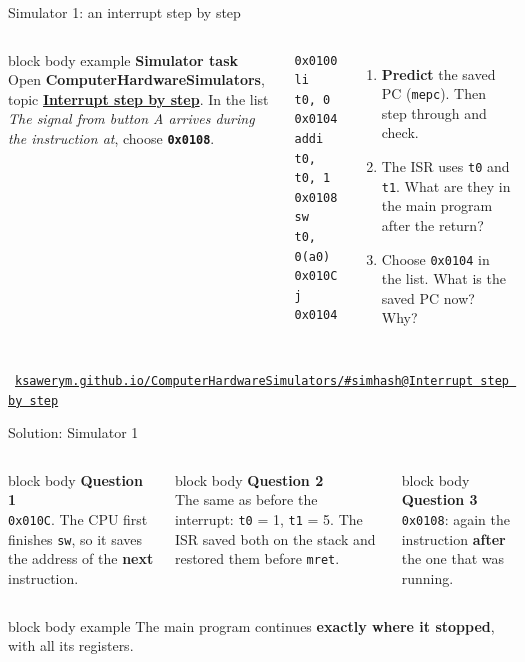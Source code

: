 \documentclass[aspectratio=169,10pt]{beamer}
\makeatletter
\newcommand{\stepbox}[2]{%
  \begin{beamercolorbox}[rounded=true,sep=0.09cm,wd=\linewidth]{block body}
    \footnotesize\textbf{#1}\\ #2
  \end{beamercolorbox}\vspace{0.06cm}}
\newcommand{\taskhead}[2]{%
  \begin{beamercolorbox}[rounded=true,sep=0.12cm,wd=\linewidth]{block body example}
    \small\textbf{#1}\\[0.04cm]
    \footnotesize #2
  \end{beamercolorbox}\vspace{0.1cm}}
\newcommand{\keymsg}[1]{%
  \begin{beamercolorbox}[rounded=true,sep=0.1cm,wd=\textwidth]{block body example}
    \centering\footnotesize #1
  \end{beamercolorbox}}
\newcommand{\simname}{\textbf{ComputerHardwareSimulators}}
\newcommand{\simbase}{https://ksawerym.github.io/ComputerHardwareSimulators/}
\newcommand{\simhash}[1]{\csname simhash@#1\endcsname}
\newcommand{\simtab}[1]{\href{\simbase\#\simhash{#1}}{\textcolor{DeepBlue}{\textbf{#1}}}}
\newcommand{\simaddr}[1]{\href{\simbase\#\simhash{#1}}{\texttt{ksawerym.github.io/ComputerHardwareSimulators/\#\simhash{#1}}}}
\newcommand{\simfoot}[1]{\par\vfill{\hfill\scriptsize\textcolor{gray}{\faLink\ #1}\par}}
\makeatother
\begin{document}
\begin{frame}[fragile]{Simulator 1: an interrupt step by step}
  \begin{columns}[T,onlytextwidth]
      \taskhead{Simulator task}{Open \simname, topic \simtab{Interrupt step by step}. In the list
        \emph{The signal from button A arrives during the instruction at}, choose \textbf{\texttt{0x0108}}.}
\begin{lstlisting}[style=rv6]
0x0100  li   t0, 0
0x0104  addi t0, t0, 1
0x0108  sw   t0, 0(a0)
0x010C  j    0x0104
\end{lstlisting}
      \footnotesize
      \begin{enumerate}\setlength{\itemsep}{6pt}
        \item \textbf{Predict} the saved PC (\texttt{mepc}). Then step through and check.
        \item The ISR uses \texttt{t0} and \texttt{t1}. What are they in the main program after the return?
        \item Choose \texttt{0x0104} in the list. What is the saved PC now? Why?
      \end{enumerate}
  \end{columns}
  \simfoot{\simaddr{Interrupt step by step}}
\end{frame}

\begin{frame}{Solution: Simulator 1}
  \vfill
  \begin{columns}[T,onlytextwidth]
      \stepbox{Question 1}{\texttt{0x010C}. The CPU first finishes \texttt{sw}, so it saves the address of the
        \textbf{next} instruction.}
      \stepbox{Question 2}{The same as before the interrupt: \texttt{t0} = 1, \texttt{t1} = 5. The ISR saved both on the stack
        and restored them before \texttt{mret}.}
      \stepbox{Question 3}{\texttt{0x0108}: again the instruction \textbf{after} the one that was running.}
  \end{columns}
  \vfill
  \keymsg{The main program continues \textbf{exactly where it stopped}, with all its registers.}
\end{frame}
\end{document}
